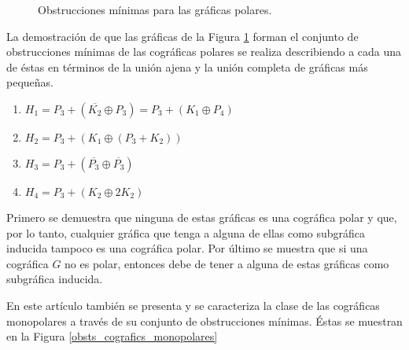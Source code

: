 \begin{figure}[H]
\begin{center}
\end{center}
\caption{Obstrucciones mínimas para las gráficas polares.}
\label{obsts_cografics_polares}
\end{figure}

La demostración de que las gráficas de la Figura \ref{obsts_cografics_polares} forman el conjunto de obstrucciones mínimas de las cográficas polares se realiza describiendo a cada una de éstas en términos de la unión ajena y la unión completa de gráficas más pequeñas.

\begin{enumerate}[(1)]
    \item $H_1 = P_3 + ( \overline{K_2} \oplus P_3) = P_3+ (K_1 \oplus P_4)$
    \item $H_2 = P_3 + (K_1 \oplus (P_3 + K_2))$
    \item $H_3 = P_3 + ( \overline{P_3} \oplus \overline{P_3})$
    \item $H_4 = P_3 + (K_2 \oplus 2K_2)$
\end{enumerate}

Primero se demuestra que ninguna de estas gráficas es una cográfica polar y que, por lo tanto, cualquier gráfica que tenga a alguna de ellas como subgráfica inducida tampoco es una cográfica polar. Por último se muestra que si una cográfica $G$ no es polar, entonces debe de tener a alguna de estas gráficas como subgráfica inducida.

En este artículo también se presenta y se caracteriza la clase de las cográficas monopolares a través de su conjunto de obstrucciones mínimas. Éstas se muestran en la Figura \ref{obsts_cografics_monopolares}



